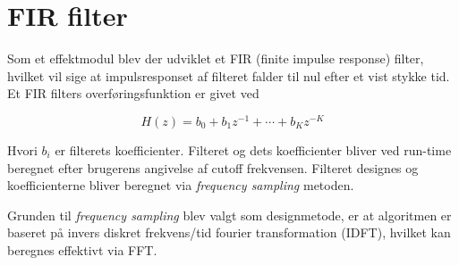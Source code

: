


\section{FIR filter}
Som et effektmodul blev der udviklet et FIR (finite impulse response) filter, hvilket vil sige at impulsresponset af filteret falder til nul efter et vist stykke tid.\newline
Et FIR filters overføringsfunktion er givet ved

\begin{equation}
H(z) = b_0 + b_1z^{-1} + \cdots + b_Kz^{-K}
\end{equation}

Hvori $b_i$ er filterets koefficienter.\cite[p.218]{Tan2013}\newline
Filteret og dets koefficienter bliver ved run-time beregnet efter brugerens angivelse af cutoff frekvensen. Filteret designes og koefficienterne bliver beregnet via \textit{frequency sampling} metoden.

Grunden til \textit{frequency sampling} blev valgt som designmetode, er at algoritmen er baseret på invers diskret frekvens/tid fourier transformation (IDFT), hvilket kan beregnes effektivt via FFT.\newline
